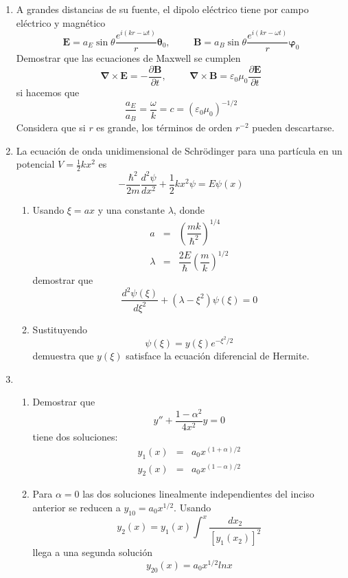 \begin{enumerate}
\item A grandes distancias de su fuente, el dipolo eléctrico tiene por campo eléctrico y magnético
\[  \mathbf{E} =a_{E} \sin \theta \dfrac{e^{i(k r - \omega t)}}{r} \bm{\theta}_{0}, \hspace{1cm} \mathbf{B} = a_{B} \sin \theta \dfrac{e^{i(k r-\omega t)}}{r} \bm{\varphi}_{0} \]
Demostrar que las ecuaciones de Maxwell se cumplen
\[ \bm{\nabla \times E} =  -\dfrac{\partial \bm{B}}{\partial t}, \hspace{1cm} \bm{\nabla \times B} =  \varepsilon_{0} \mu_{0} \dfrac{\partial \bm{E}}{\partial t}\]
si hacemos que
\[ \dfrac{a_{E}}{a_{B}} = \dfrac{\omega}{k} =  c = (\varepsilon_{0} \mu_{0})^{-1/2} \]
Considera que si $r$ es grande, los términos de orden $r^{-2}$ pueden descartarse.
\item La ecuación de onda unidimensional de Schrödinger para una partícula en un potencial $V=\frac{1}{2} k x^{2}$ es
\[ - \dfrac{\hbar^{2}}{2m} \dfrac{d^{2} \psi}{d x^{2}} + \dfrac{1}{2} k x^{2} \psi =  E \psi(x)\]
\begin{enumerate}
\item Usando $\xi = ax$ y una constante $\lambda$, donde
\begin{eqnarray*}
a &=& \left( \dfrac{m k}{\hbar^{2}} \right)^{1/4}  \\ \nonumber
\lambda &=& \dfrac{2E}{\hbar} \left(\dfrac{m}{k} \right)^{1/2} \nonumber
\end{eqnarray*}
demostrar que
\[ \dfrac{d^{2} \psi(\xi)}{d \xi^{2}} + (\lambda - \xi^{2}) \psi(\xi) = 0 \]
\item Sustituyendo
\[ \psi(\xi) = y(\xi) e^{-\xi^{2}/2}\]
demuestra que $y(\xi)$ satisface la ecuación diferencial de Hermite.
\end{enumerate}
\item 
\begin{enumerate}
\item Demostrar que
\[  y'' + \dfrac{1 - \alpha^{2}}{4 x^{2}} y = 0\]
tiene dos soluciones:
\begin{eqnarray*}
y_{1}(x) &=& a_{0} x^{(1+\alpha)/2} \\
y_{2}(x) &=& a_{0} x^{(1-\alpha)/2}
\end{eqnarray*}
\item Para $\alpha =0$ las dos soluciones linealmente independientes del inciso anterior se reducen a $y_{10} = a_{0} x^{1/2}$. Usando
\[ y_{2}(x) =  y_{1}(x) \int^{x} \dfrac{dx_{2}}{[y_{1}(x_{2})]^{2}}\]
llega a una segunda solución
\[ y_{20}(x) = a_{0} x^{1/2} ln x \]
\end{enumerate}
\end{enumerate}
